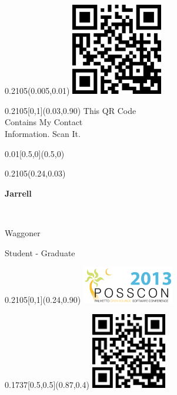 \documentclass[a4paper]{article}
\begin{document}

\begin{textblock}{0.2105}(0.005,0.01)
  \includegraphics[width=4cm]{fig/main}
\end{textblock}

\begin{textblock}{0.2105}[0,1](0.03,0.90) 
  This QR Code \\ Contains My Contact \\ Information.  Scan It.
\end{textblock}

\begin{textblock}{0.01}[0.5,0](0.5,0) 
\end{textblock}

\begin{textblock}{0.2105}(0.24,0.03)
  \begin{Huge}\textbf{Jarrell}\end{Huge} \\
  \begin{Large} Waggoner \end{Large}

  \vspace{2em}

  Student - Graduate
\end{textblock}

\begin{textblock}{0.2105}[0,1](0.24,0.90)
  \includegraphics[width=4cm]{fig/logo}
\end{textblock}


\begin{textblock}{0.1737}[0.5,0.5](0.87,0.4)
  \includegraphics[width=3.3cm]{fig/main}
\end{textblock}
\end{document}
